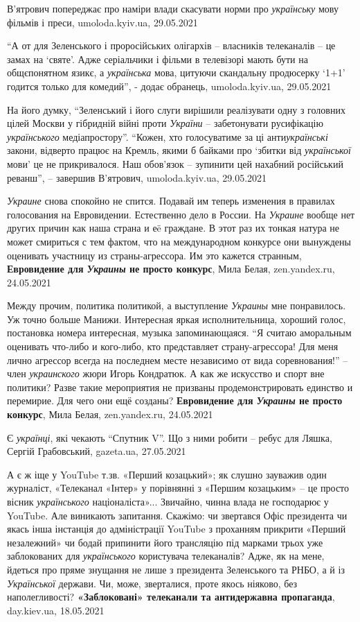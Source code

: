 В'ятрович попереджає про наміри влади скасувати норми про \emph{українську} мову
фільмів і преси, umoloda.kyiv.ua, 29.05.2021

\enquote{А от для Зеленського і проросійських олігархів – власників телеканалів
– це замах на \enquote{святе}. Адже серіальчики і фільми в телевізорі мають
бути на общєпонятном язикє, а \emph{українська} мова, цитуючи скандальну
продюсерку \enquote{1+1} годится только для комедий}, - додає обранець,
umoloda.kyiv.ua, 29.05.2021

На його думку, \enquote{Зеленський і його слуги вирішили реалізувати одну з
головних цілей Москви у гібридній війні проти \emph{України} – забетонувати
русифікацію \emph{українського} медіапростору}.  \enquote{Кожен, хто голосуватиме за
ці анти\emph{українські} закони, відверто працює на Кремль, якими б байками про
\enquote{збитки від \emph{української} мови} це не прикривалося. Наш обов'язок –
зупинити цей нахабний російський реванш}, – завершив В'ятрович,
umoloda.kyiv.ua, 29.05.2021

\emph{Украине} снова спокойно не спится. Подавай им теперь изменения в правилах
голосования на Евровидении. Естественно дело в России. На \emph{Украине}
вообще нет других причин как наша страна и еë граждане.  В этот раз их тонкая
натура не может смириться с тем фактом, что на международном конкурсе они
вынуждены оценивать участницу из страны-агрессора. Им это кажется странным,
\textbf{Евровидение для \emph{Украины} не просто конкурс}, Мила Белая,
zen.yandex.ru, 24.05.2021

Между прочим, политика политикой, а выступление \emph{Украины} мне понравилось.
Уж точно больше Манижи. Интересная яркая исполнительница, хороший голос,
постановка номера интересная, музыка запоминающаяся.  \enquote{Я считаю
аморальным оценивать что-либо и кого-либо, кто представляет страну-агрессора!
Для меня лично агрессор всегда на последнем месте независимо от вида
соревнования!} – член \emph{украинского} жюри Игорь Кондратюк. А как же
искусство и спорт вне политики? Разве такие мероприятия не призваны
продемонстрировать единство и перемирие. Для чего они ещё созданы?
\textbf{Евровидение для \emph{Украины} не просто конкурс}, Мила Белая,
zen.yandex.ru, 24.05.2021

Є \emph{українці}, які чекають \enquote{Спутник V}. Що з ними робити – ребус
для Ляшка, Сергій Грабовський, gazeta.ua, 27.05.2021

А є ж іще у YouTube т.зв. «Перший козацький»; як слушно зауважив один
журналіст, «Телеканал «Інтер» у порівнянні з «Першим козацьким» – це просто
вісник \emph{українського} націоналіста»... Звичайно, чинна влада не господарює у
YouTube. Але виникають запитання. Скажімо: чи звертався Офіс президента чи
якась інша інстанція до адміністрації YouTube з проханням прикрити «Перший
незалежний» чи бодай припинити його трансляцію під марками трьох уже
заблокованих для \emph{українського} користувача телеканалів? Адже, як на мене,
йдеться про пряме знущання не лише з президента Зеленського та РНБО, а й із
\emph{Української} держави. Чи, може, зверталися, проте якось ніяково, без
наполегливості? \textbf{«Заблоковані» телеканали та антидержавна пропаганда}, day.kiev.ua, 18.05.2021

